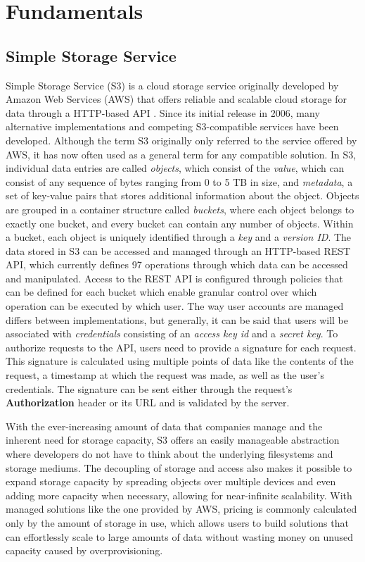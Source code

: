 \chapter{Fundamentals}

\section{Simple Storage Service}
\label{S3_desc}
Simple Storage Service (S3) is a cloud storage service originally developed by Amazon Web Services (AWS) that offers reliable and scalable cloud storage for data through a HTTP-based API \cite{AWS_S3_Release} \cite{S3_API}. Since its initial release in 2006, many alternative implementations and competing S3-compatible services have been developed. Although the term S3 originally only referred to the service offered by AWS, it has now often used as a general term for any compatible solution.
In S3, individual data entries are called \textit{objects}, which consist of the \textit{value}, which can consist of any sequence of bytes ranging from 0 to 5 TB in size\cite{AWS_S3_FAQ}, and \textit{metadata}, a set of key-value pairs that stores additional information about the object. Objects are grouped in a container structure called \textit{buckets}, where each object belongs to exactly one bucket, and every bucket can contain any number of objects. Within a bucket, each object is uniquely identified through a \textit{key} and a \textit{version ID}.
The data stored in S3 can be accessed and managed through an HTTP-based REST API, which currently defines 97\cite{S3_API} operations through which data can be accessed and manipulated.
Access to the REST API is configured through policies that can be defined for each bucket which enable granular control over which operation can be executed by which user. The way user accounts are managed differs between implementations, but generally, it can be said that users will be associated with \textit{credentials} consisting of an \textit{access key id} and a \textit{secret key}. To authorize requests to the API, users need to provide a signature for each request. This signature is calculated using multiple points of data like the contents of the request, a timestamp at which the request was made, as well as the user's credentials. The signature can be sent either through the request's \textbf{Authorization} header or its URL and is validated by the server.

With the ever-increasing amount of data that companies manage and the inherent need for storage capacity, S3 offers an easily manageable abstraction where developers do not have to think about the underlying filesystems and storage mediums. The decoupling of storage and access also makes it possible to expand storage capacity by spreading objects over multiple devices and even adding more capacity when necessary, allowing for near-infinite scalability. With managed solutions like the one provided by AWS, pricing is commonly calculated only by the amount of storage in use, which allows users to build solutions that can effortlessly scale to large amounts of data without wasting money on unused capacity caused by overprovisioning.


